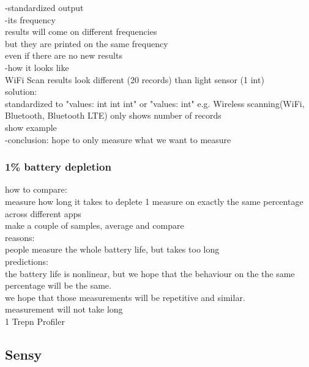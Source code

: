 					
		-standardized output\\
				-its frequency\\
					results will come on different frequencies\\
					but they are printed on the same frequency\\
						even if there are no new results\\
				-how it looks like\\
					WiFi Scan results look different (20 records) than light sensor (1 int)\\
					solution:\\
						standardized to "values: int int int" or "values: int"
							e.g. Wireless scanning(WiFi, Bluetooth, Bluetooth LTE) only shows number of records\\
							show example\\	
		-conclusion: hope to only measure what we want to measure\\				
				
\subsubsection{1\% battery depletion}				
how to compare:\\
	measure how long it takes to deplete 1%
		measure on exactly the same percentage across different apps\\
		make a couple of samples, average and compare\\
		reasons:\\
			people measure the whole battery life, but takes too long\\
			
			
		predictions:\\
			the battery life is nonlinear, but we hope that the behaviour on the the same percentage will be the same.\\
			we hope that those measurements will be repetitive and similar.\\
			measurement will not take long\\
			1%
	Trepn Profiler\\
			
			
		
		
		
\subsection{Sensy}
